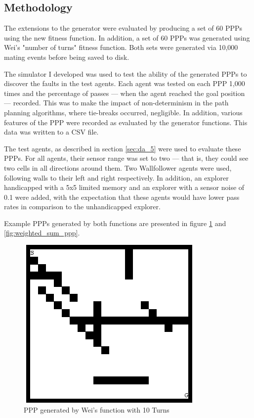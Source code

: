 \documentclass[authoryearcitations]{UoYCSproject}
\begin{document}
\subsection{Methodology}
\label{sec:gen_eval_method}

The extensions to the generator were evaluated by producing a set of 60 PPPs using the new fitness function. In addition, a set of 60 PPPs was generated using Wei's "number of turns" fitness function. Both sets were generated via 10,000 mating events before being saved to disk.

The simulator I developed was used to test the ability of the generated PPPs to discover the faults in the test agents. Each agent was tested on each PPP 1,000 times and the percentage of passes --- when the agent reached the goal position --- recorded. This was to make the impact of non-determinism in the path planning algorithms, where tie-breaks occurred, negligible. In addition, various features of the PPP were recorded as evaluated by the generator functions. This data was written to a CSV file.

The test agents, as described in section \ref{sec:da_5} were used to evaluate these PPPs. For all agents, their sensor range was set to two --- that is, they could see two cells in all directions around them. Two Wallfollower agents were used, following walls to their left and right respectively. In addition, an explorer handicapped with a 5x5 limited memory and an explorer with a sensor noise of 0.1 were added, with the expectation that these agents would have lower pass rates in comparison to the unhandicapped explorer.

Example PPPs generated by both functions are presented in figure \ref{fig:wei_ppp} and \ref{fig:weighted_sum_ppp}.

\begin{figure}
\graphicspath{ {EvalPics/} }
\includegraphics[scale=0.65]{wei_26.png}
\caption{PPP generated by Wei's function with 10 Turns}
\label{fig:wei_ppp}
\end{figure}
\end{document}

